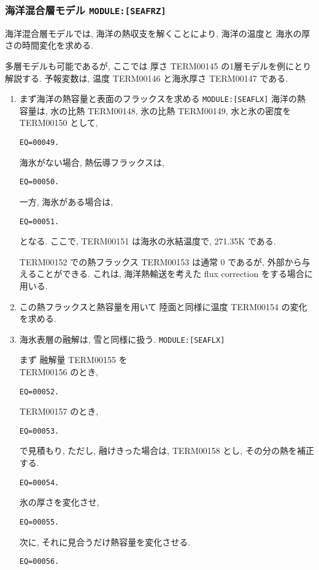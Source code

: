 \subsubsection{海洋混合層モデル \texttt{MODULE:[SEAFRZ]}}

海洋混合層モデルでは,
海洋の熱収支を解くことにより, 海洋の温度と
海氷の厚さの時間変化を求める.

多層モデルも可能であるが,
ここでは 厚さ TERM00145 の1層モデルを例にとり解説する.
予報変数は, 温度 TERM00146 と海氷厚さ TERM00147 である.

\begin{enumerate}
\item  まず海洋の熱容量と表面のフラックスを求める
       \texttt{MODULE:[SEAFLX]}
海洋の熱容量は,
水の比熱 TERM00148, 氷の比熱 TERM00149, 水と氷の密度を TERM00150 として,
\begin{verbatim}
EQ=00049.
\end{verbatim}

海氷がない場合, 熱伝導フラックスは,
\begin{verbatim}
EQ=00050.
\end{verbatim}
一方, 海氷がある場合は,
\begin{verbatim}
EQ=00051.
\end{verbatim}
となる. ここで, TERM00151 は海氷の氷結温度で, 271.35K である.

TERM00152 での熱フラックス TERM00153 は通常 0 であるが,
外部から与えることができる.
これは, 海洋熱輸送を考えた flux correction をする場合に用いる.

\item この熱フラックスと熱容量を用いて
      陸面と同様に温度 TERM00154 の変化を求める.

\item 海氷表層の融解は, 雪と同様に扱う.
       \texttt{MODULE:[SEAFLX]}

まず 融解量 TERM00155 を  \\
TERM00156 のとき, 
\begin{verbatim}
EQ=00052.
\end{verbatim}
TERM00157 のとき, 
\begin{verbatim}
EQ=00053.
\end{verbatim}
で見積もり,
ただし, 融けきった場合は, TERM00158 とし, その分の熱を補正する.
\begin{verbatim}
EQ=00054.
\end{verbatim}
氷の厚さを変化させ,
\begin{verbatim}
EQ=00055.
\end{verbatim}
次に, それに見合うだけ熱容量を変化させる.
\begin{verbatim}
EQ=00056.
\end{verbatim}


\end{enumerate}
